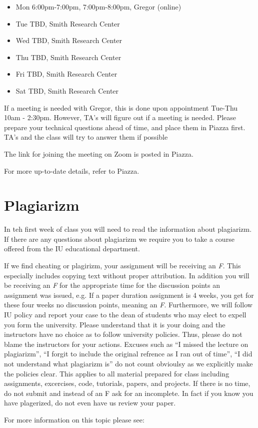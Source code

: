 
\begin{itemize}
\item Mon 6:00pm-7:00pm, 7:00pm-8:00pm, Gregor (online)
\item Tue TBD, Smith Research Center
\item Wed TBD, Smith Research Center
\item Thu TBD, Smith Research Center
\item Fri TBD, Smith Research Center
\item Sat TBD, Smith Research Center
\end{itemize}


If a meeting is needed with Gregor, this is done upon appointment
Tue-Thu 10am - 2:30pm. However, TA's will figure out if a meeting is needed.
Please prepare your technical questions ahead of time, and place them in Piazza
first. TA's and the class will try to answer them if possible

The link for joining the meeting on Zoom is posted in Piazza.



For more up-to-date details, refer to Piazza.

\section{Plagiarizm}

In teh first week of class you will need to read the information about
plagiarizm. If there are any questions about plagiarizm we require you
to take a course offered from the IU educational department.

\begin{WARNING}
  If we find cheating or plagirizm, your assignment will be receiving
  an {\em F}. This especially includes copying text without proper
  attribution. In addition you will be receiving an {\em F} for the
  appropriate time for the discussion points an assignment was issued,
  e.g. If a paper duration assignment is 4 weeks, you get for these
  four weeks no discussion points, meaning an {\em F}. Furthermore, we
  will follow IU policy and report your case to the dean of students
  who may elect to expell you form the university. Please understand
  that it is your doing and the instructors have no choice as to
  follow university policies. Thus, please do not blame the
  instructors for your actions. Excuses such as ``I missed the lecture
  on plagiarizm'', ``I forgit to include the original refrence as I
  ran out of time'', ``I did not understand what plagiarizm is'' do
  not count obvioulsy as we explicitly make the policies clear. This
  applies to all material prepared for class including assignments,
  excercises, code, tutorials, papers, and projects. If there is no
  time, do not submit and instead of an F ask for an incomplete. In
  fact if you know you have plagerized, do not even have us review
  your paper. 
\end{WARNING}

For more information on this topic please see:

